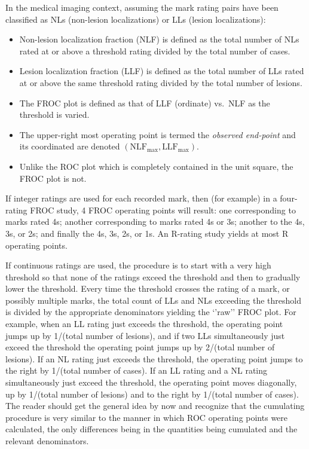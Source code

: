 \documentclass[
]{book}
\begin{document}
In the medical imaging context, assuming the mark rating pairs have been classified as NLs (non-lesion localizations) or LLs (lesion localizations):

\begin{itemize}
\item
  Non-lesion localization fraction (NLF) is defined as the total number of NLs rated at or above a threshold rating divided by the total number of cases.
\item
  Lesion localization fraction (LLF) is defined as the total number of LLs rated at or above the same threshold rating divided by the total number of lesions.
\item
  The FROC plot is defined as that of LLF (ordinate) vs.~NLF as the threshold is varied.
\item
  The upper-right most operating point is termed the \emph{observed end-point} and its coordinated are denoted \((\text{NLF}_{\text{max}}, \text{LLF}_{\text{max}})\).
\item
  Unlike the ROC plot which is completely contained in the unit square, the FROC plot is not.
\end{itemize}

If integer ratings are used for each recorded mark, then (for example) in a four-rating FROC study, 4 FROC operating points will result: one corresponding to marks rated 4s; another corresponding to marks rated 4s or 3s; another to the 4s, 3s, or 2s; and finally the 4s, 3s, 2s, or 1s. An R-rating study yields at most R operating points.

If continuous ratings are used, the procedure is to start with a very high threshold so that none of the ratings exceed the threshold and then to gradually lower the threshold. Every time the threshold crosses the rating of a mark, or possibly multiple marks, the total count of LLs and NLs exceeding the threshold is divided by the appropriate denominators yielding the `'raw'' FROC plot. For example, when an LL rating just exceeds the threshold, the operating point jumps up by 1/(total number of lesions), and if two LLs simultaneously just exceed the threshold the operating point jumps up by 2/(total number of lesions). If an NL rating just exceeds the threshold, the operating point jumps to the right by 1/(total number of cases). If an LL rating and a NL rating simultaneously just exceed the threshold, the operating point moves diagonally, up by 1/(total number of lesions) and to the right by 1/(total number of cases). The reader should get the general idea by now and recognize that the cumulating procedure is very similar to the manner in which ROC operating points were calculated, the only differences being in the quantities being cumulated and the relevant denominators.
\end{document}

